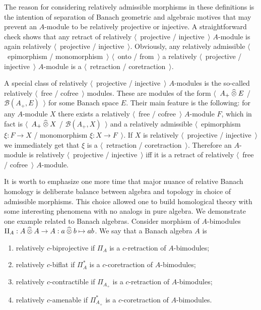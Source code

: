 The reason for considering relatively admissible morphisms in these definitions
is the intention of separation of Banach geometric and algebraic motives that 
may prevent an $A$-module to be relatively projective or injective. 
A straightforward check shows that any retract of 
relatively $\langle$~projective / injective~$\rangle$ $A$-module is 
again relatively $\langle$~projective / injective~$\rangle$. 
Obviously, any relatively admissible $\langle$~epimorphism
/ monomorphism~$\rangle$ $\langle$~onto / from~$\rangle$ a relatively
$\langle$~projective / injective~$\rangle$ $A$-module is a $\langle$~retraction
/ coretraction~$\rangle$.

A special class of relatively $\langle$~projective / injective~$\rangle$
$A$-modules is the so-called relatively $\langle$~free / cofree~$\rangle$
modules. These are modules of the form $\langle$~$A_+\mathbin{\widehat{\otimes}} E$ /
$\mathcal{B}(A_+,E)$~$\rangle$ for some Banach space $E$. Their main feature is
the following: for any $A$-module $X$ there exists a relatively $\langle$~free /
cofree~$\rangle$ $A$-module $F$, which in fact is $\langle$~$A_+\mathbin{\widehat{\otimes}} X$ /
$\mathcal{B}(A_+,X)$~$\rangle$ and a relatively admissible $\langle$~epimorphism
$\xi:F\to X$ / monomorphism $\xi:X\to F$~$\rangle$. If $X$ is relatively
$\langle$~projective / injective~$\rangle$ we immediately get that $\xi$ is a
$\langle$~retraction / coretraction~$\rangle$. Therefore an $A$-module is
relatively $\langle$~projective / injective~$\rangle$ iff it is a retract of
relatively $\langle$~free / cofree~$\rangle$ $A$-module. 

It is worth to emphasize one more time that major nuance of relative Banach
homology is deliberate balance between algebra and topology in choice of
admissible morphisms. This choice allowed one to build homological theory with
some interesting phenomena with no analogs in pure algebra. We demonstrate one
example related to Banach algebras. Consider morphism of $A$-bimodules
$\Pi_A:A\mathbin{\widehat{\otimes}} A\to A:a\mathbin{\widehat{\otimes}} b\mapsto ab$. We say that a Banach algebra
$A$ is 
\begin{enumerate}[label = (\roman*)]
  \item relatively $c$-biprojective if $\Pi_A$ is a $c$-retraction of
  $A$-bimodules;

  \item relatively $c$-biflat if $\Pi_A^*$ is a $c$-coretraction of 
  $A$-bimodules;

  \item relatively $c$-contractible if $\Pi_{A_+}$ is a $c$-retraction of
  $A$-bimodules;

  \item relatively $c$-amenable if $\Pi_{A_+}^*$ is a $c$-coretraction of
  $A$-bimodules.
\end{enumerate}

